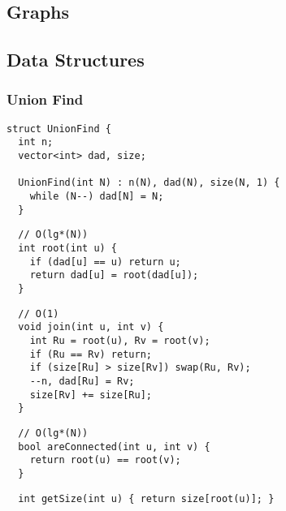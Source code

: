 \documentclass[twoside]{article}
\begin{document}
\begin{multicols*}{2}
    \tableofcontents
\end{multicols*}
\begin{multicols*}{2}
{
[\vspace{2em}]
\section*{Graphs}
}
{
\subsection*{Data Structures}
}
{
\subsubsection*{Union Find}
}
\begin{verbatim}
struct UnionFind {
  int n;
  vector<int> dad, size;

  UnionFind(int N) : n(N), dad(N), size(N, 1) {
    while (N--) dad[N] = N;
  }
\end{verbatim}
\vspace{-12pt}
\begin{verbatim}
  // O(lg*(N))
  int root(int u) {
    if (dad[u] == u) return u;
    return dad[u] = root(dad[u]);
  }
\end{verbatim}
\vspace{-12pt}
\begin{verbatim}
  // O(1)
  void join(int u, int v) {
    int Ru = root(u), Rv = root(v);
    if (Ru == Rv) return;
    if (size[Ru] > size[Rv]) swap(Ru, Rv);
    --n, dad[Ru] = Rv;
    size[Rv] += size[Ru];
  }
\end{verbatim}
\vspace{-12pt}
\begin{verbatim}
  // O(lg*(N))
  bool areConnected(int u, int v) {
    return root(u) == root(v);
  }
\end{verbatim}
\vspace{-12pt}
\begin{verbatim}
  int getSize(int u) { return size[root(u)]; }


\end{verbatim}
\end{multicols*}
\end{document}

